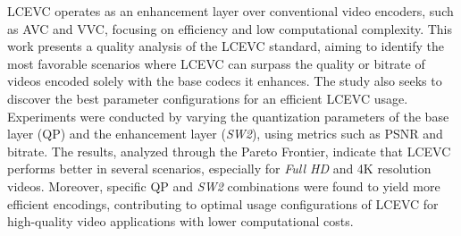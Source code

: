 \acrfull{LCEVC} operates as an enhancement layer over conventional video encoders, 
such as \acrfull{AVC} and \acrfull{VVC}, focusing on efficiency and low computational 
complexity. This work presents a quality analysis of the \acrshort{LCEVC} standard, 
aiming to identify the most favorable scenarios where \acrshort{LCEVC} can surpass the 
quality or bitrate of videos encoded solely with the base codecs it enhances. The study 
also seeks to discover the best parameter configurations for an efficient \acrshort{LCEVC} usage. Experiments 
were conducted by varying the quantization parameters of the base layer (\acrshort{QP}) 
and the enhancement layer (\textit{SW2}), using metrics such as \acrfull{PSNR} and bitrate. 
The results, analyzed through the Pareto Frontier, indicate that \acrshort{LCEVC} performs 
better in several scenarios, especially for \textit{Full HD} and 4K resolution videos. 
Moreover, specific \acrshort{QP} and \textit{SW2} combinations were found to yield more 
efficient encodings, contributing to optimal usage configurations of \acrshort{LCEVC} for 
high-quality video applications with lower computational costs.
